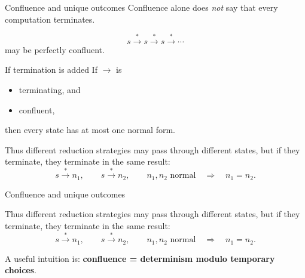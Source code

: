 \documentclass[handout,aspectratio=169,11pt]{beamer}
\newif\ifinbackup
\newcommand{\step}[1]{\xrightarrow{#1}}
\newcommand{\Takeaway}[1]{\begin{exampleblock}{}#1\end{exampleblock}}
\begin{document}
\begin{frame}{Confluence and unique outcomes}
  Confluence alone does \emph{not} say that every computation terminates.

  \[
      s\step{*}s\step{*}s\step{*}\cdots
  \]
  may be perfectly confluent.

  \begin{block}{If termination is added}
    If $\to$ is
    \begin{itemize}
      \item terminating, and
      \item confluent,
    \end{itemize}
    then every state has at most one normal form.
  \end{block}

  Thus different reduction strategies may pass through different states,
  but if they terminate, they terminate in the same result:
  \[
      s\step{*}n_1,\qquad
      s\step{*}n_2,
      \qquad n_1,n_2\text{ normal}
      \quad\Longrightarrow\quad
      n_1=n_2.
  \]


\end{frame}


\begin{frame}{Confluence and unique outcomes}

  Thus different reduction strategies may pass through different states,
  but if they terminate, they terminate in the same result:
  \[
      s\step{*}n_1,\qquad
      s\step{*}n_2,
      \qquad n_1,n_2\text{ normal}
      \quad\Longrightarrow\quad
      n_1=n_2.
  \]

  \Takeaway{A useful intuition is:
  \textbf{confluence = determinism modulo temporary choices}.}
\end{frame}

\appendix
\inbackuptrue
\end{document}
